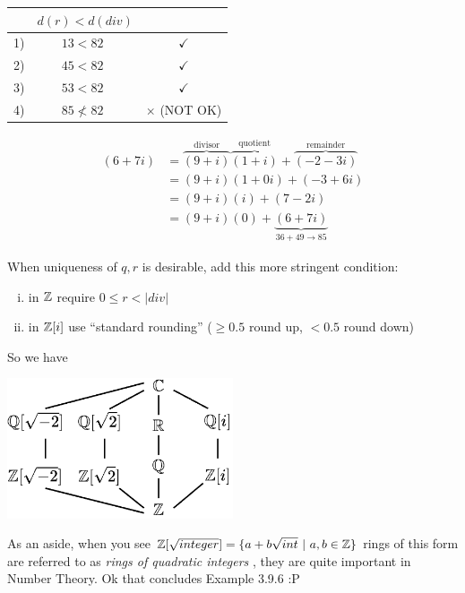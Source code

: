 \begin{example}
\begin{enumerate}
\begin{center}
        \end{center}
        \begin{minipage}[t]{0.4\textwidth} %
            \centering
            \vspace{0.1in}
            \begin{tabular}{c|c c}
                & $d(r) < d(div)$ \\ \hline
                1) & $13 < 82 \ \ $ &$\checkmark$ \\
                2) & $45 < 82 \ \ $ &$\checkmark$ \\
                3) & $53 < 82 \ \ $ &$\checkmark$ \\
                4) & $85 \not< 82 \ \ $ &$\times$ (NOT OK)
            \end{tabular}
        \end{minipage}%
        \hfill %
        \begin{minipage}[t]{0.55\textwidth} %
            \begin{align}
                (6+7i) &= \overbrace{(9+i)}^{\text{divisor}}
                          \overbrace{(1+i)}^{\text{quotient}} + 
                          \overbrace{(-2-3i)}^{\text{remainder}} \nonumber \\
                       &= (9+i)(1+0i)+ (-3+6i) \nonumber \\
                       &= (9+i)(i) + (7-2i) \nonumber \\
                       &= (9+i)(0) + \underbrace{(6+7i)}_{36+49 \rightarrow 85} \nonumber 
            \end{align}
        \end{minipage}
        When uniqueness of $q,r$ is desirable, add this more stringent condition:
        \begin{enumerate}[i)]
            \item in ${\mathbb{ Z}}$ require $0\leq r < |div|$
            \item in ${\mathbb{ Z}}[i]$ use ``standard rounding'' ($\geq 0.5$ round up, $<0.5$ round down)
        \end{enumerate}
    \end{enumerate}
    \newpage
    So we have 
    \begin{center}
        \includegraphics[width=0.5\textwidth]{Figures/ComplexRingLattice.png}
    \end{center}
    As an aside, when you see ${\mathbb{ Z}}[\sqrt{integer}] = \{a+b\sqrt{int} \ | \ a,b \in {\mathbb{ Z}}\}$ rings of this form are referred to as \textit{rings of quadratic integers} , they are quite important in Number Theory.
    Ok that concludes Example 3.9.6 :P
\end{example}
